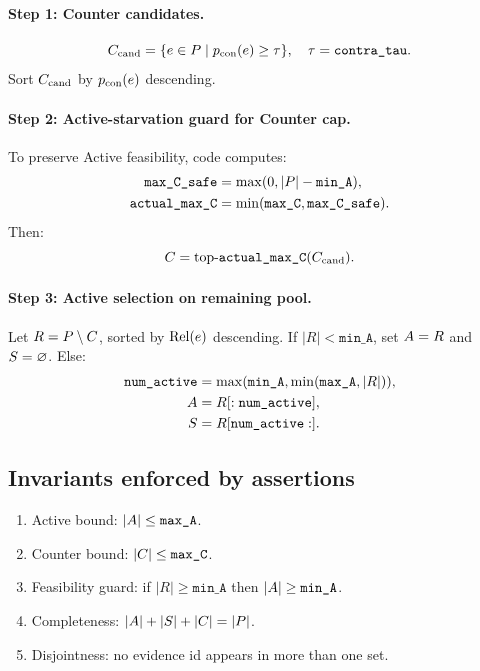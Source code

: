 \paragraph{Step 1: Counter candidates.}
\begin{equation}
C_{\text{cand}} = \{e\in P \mid p_{\mathrm{con}}(e)\ge\tau\}, \quad \tau=\texttt{contra\_tau}.
\end{equation}
Sort $C_{\text{cand}}$ by $p_{\mathrm{con}}(e)$ descending.

\paragraph{Step 2: Active-starvation guard for Counter cap.}
To preserve Active feasibility, code computes:
\begin{align}
\texttt{max\_C\_safe} &= \max(0, |P|-\texttt{min\_A}), \\
\texttt{actual\_max\_C} &= \min(\texttt{max\_C}, \texttt{max\_C\_safe}).
\end{align}
Then:
\begin{equation}
C = \text{top-}\texttt{actual\_max\_C}(C_{\text{cand}}).
\end{equation}

\paragraph{Step 3: Active selection on remaining pool.}
Let $R=P\setminus C$, sorted by $\operatorname{Rel}(e)$ descending.
If $|R|<\texttt{min\_A}$, set $A=R$ and $S=\varnothing$.
Else:
\begin{align}
\texttt{num\_active} &= \max(\texttt{min\_A}, \min(\texttt{max\_A}, |R|)), \\
A &= R[:\texttt{num\_active}], \\
S &= R[\texttt{num\_active}:].
\end{align}

\subsection{Invariants enforced by assertions}
\begin{enumerate}
\item Active bound: $|A|\le\texttt{max\_A}$.
\item Counter bound: $|C|\le\texttt{max\_C}$.
\item Feasibility guard: if $|R|\ge\texttt{min\_A}$ then $|A|\ge\texttt{min\_A}$.
\item Completeness: $|A|+|S|+|C|=|P|$.
\item Disjointness: no evidence id appears in more than one set.
\end{enumerate}

